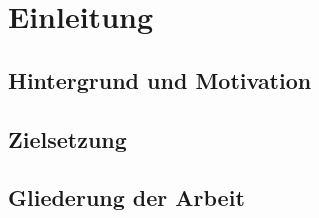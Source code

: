 \chapter{Einleitung}
\label{cha:Einleitung}

\section{Hintergrund und Motivation}

\section{Zielsetzung}

\section{Gliederung der Arbeit}
